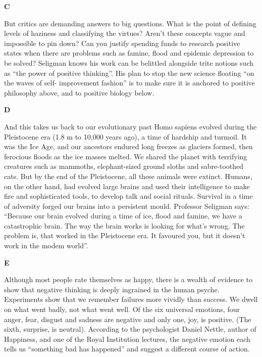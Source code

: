 \documentclass{../templateReading/cdreading}
\begin{document}
\textbf{C}\par

But critics are demanding answers to big questions. What is the point of defining levels of haziness and classifying the virtues? Aren’t these concepts vague and impossible to pin down? Can you justify spending funds to research positive states when there are problems such as famine, flood and epidemic depression to be solved? Seligman knows his work can be belittled alongside trite notions such as “the power of positive thinking”. His plan to stop the new science floating “on the waves of self- improvement fashion” is to make sure it is anchored to positive philosophy above, and to positive biology below.

\textbf{D}\par

And this takes us back to our evolutionary past Homo sapiens evolved during the Pleistocene era (1.8 m to 10,000 years ago), a time of hardship and turmoil. It was the Ice Age, and our ancestors endured long freezes as glaciers formed, then ferocious floods as the ice masses melted. We shared the planet with terrifying creatures such as mammoths, elephant-sized ground sloths and sabre-toothed cats. But by the end of the Pleistocene, all these animals were extinct. Humans, on the other hand, had evolved large brains and used their intelligence to make fire and sophisticated tools, to develop talk and social rituals. Survival in a time of adversity forged our brains into a persistent mould. Professor Seligman says: “Because our brain evolved during a time of ice, flood and famine, we have a catastrophic brain. The way the brain works is looking for what’s wrong. The problem is, that worked in the Pleistocene era. It favoured you, but it doesn’t work in the modem world”.

\textbf{E}\par

Although most people rate themselves as happy, there is a wealth of evidence to show that negative thinking is deeply ingrained in the human psyche. Experiments show that we remember failures more vividly than success. We dwell on what went badly, not what went well. Of the six universal emotions, four anger, fear, disgust and sadness are negative and only one, joy, is positive. (The sixth, surprise, is neutral). According to the psychologist Daniel Nettle, author of Happiness, and one of the Royal Institution lectures, the negative emotion each tells us “something bad has happened” and suggest a different course of action.
\end{document}
